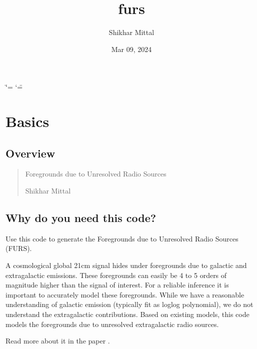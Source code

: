 \documentclass[letterpaper,10pt,english]{sphinxmanual}
\title{furs}
\date{Mar 09, 2024}
\author{Shikhar Mittal}
\begin{document}
\ifdefined\shorthandoff
  \ifnum\catcode`\=\string=\active\shorthandoff{=}\fi
  \ifnum\catcode`\"=\active{}\fi
\fi

\pagestyle{empty}
\sphinxmaketitle
\pagestyle{plain}
\sphinxtableofcontents
\pagestyle{normal}
\label{\detokenize{index::doc}}


\sphinxstepscope


\chapter{Basics}
\label{\detokenize{basics:basics}}\label{\detokenize{basics::doc}}

\section{Overview}
\label{\detokenize{basics:overview}}\begin{quote}\begin{description}
\sphinxAtStartPar
Foregrounds due to Unresolved Radio Sources

\sphinxAtStartPar
Shikhar Mittal

\sphinxAtStartPar
{}

\end{description}\end{quote}


\section{Why do you need this code?}
\label{\detokenize{basics:why-do-you-need-this-code}}
\sphinxAtStartPar
Use this code to generate the Foregrounds due to
Unresolved Radio Sources (FURS).

\sphinxAtStartPar
A cosmological global 21\sphinxhyphen{}cm signal hides under foregrounds due to
galactic and extragalactic emissions. These foregrounds can easily be 4
to 5 orders of magnitude higher than the signal of interest. For a
reliable inference it is important to accurately model these
foregrounds. While we have a reasonable understanding of galactic
emission (typically fit as log\sphinxhyphen{}log polynomial), we do not understand the
extragalactic contributions. Based on existing models, this code models
the foregrounds due to unresolved extragalactic radio sources.

\sphinxAtStartPar
Read more about it in the paper .
\end{document}

